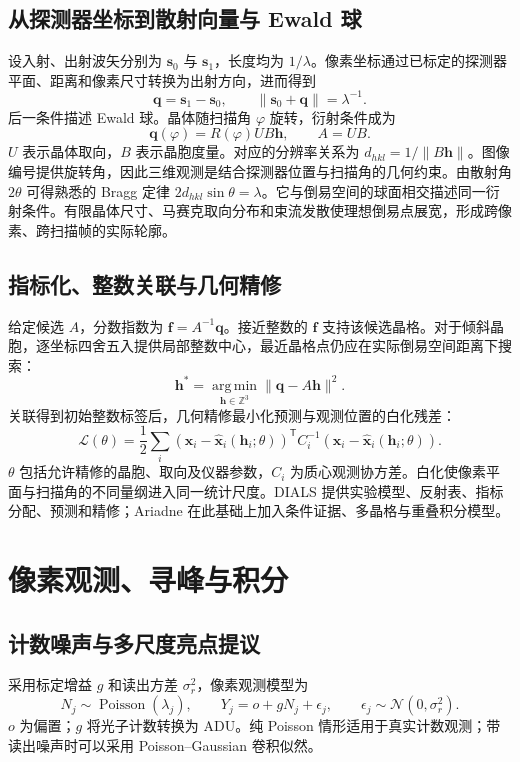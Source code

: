 \documentclass[UTF8,11pt,a4paper,fontset=fandol]{ctexart}
\newcommand{\N}{\mathcal{N}}
\newcommand{\T}{\mathsf{T}}
\newcommand{\argmin}{\operatorname*{arg\,min}}
\begin{document}
\subsection{从探测器坐标到散射向量与 Ewald 球}
设入射、出射波矢分别为 $\bm s_0$ 与 $\bm s_1$，长度均为 $1/\lambda$。像素坐标通过已标定的探测器平面、距离和像素尺寸转换为出射方向，进而得到
\begin{equation}
\bm q=\bm s_1-\bm s_0,\qquad
\|\bm s_0+\bm q\|=\lambda^{-1}.
\end{equation}
后一条件描述 Ewald 球。晶体随扫描角 $\varphi$ 旋转，衍射条件成为
\begin{equation}
\bm q(\varphi)=R(\varphi)UB\bm h,
\qquad A=UB.
\end{equation}
$U$ 表示晶体取向，$B$ 表示晶胞度量。对应的分辨率关系为 $d_{hkl}=1/\|B\bm h\|$。图像编号提供旋转角，因此三维观测是结合探测器位置与扫描角的几何约束。由散射角 $2\theta$ 可得熟悉的 Bragg 定律 $2d_{hkl}\sin\theta=\lambda$。它与倒易空间的球面相交描述同一衍射条件。有限晶体尺寸、马赛克取向分布和束流发散使理想倒易点展宽，形成跨像素、跨扫描帧的实际轮廓。

\subsection{指标化、整数关联与几何精修}
给定候选 $A$，分数指数为 $\bm f=A^{-1}\bm q$。接近整数的 $\bm f$ 支持该候选晶格。对于倾斜晶胞，逐坐标四舍五入提供局部整数中心，最近晶格点仍应在实际倒易空间距离下搜索：
\begin{equation}
\bm h^*=\argmin_{\bm h\in\mathbb Z^3}\|\bm q-A\bm h\|^2.
\end{equation}
关联得到初始整数标签后，几何精修最小化预测与观测位置的白化残差：
\begin{equation}
\mathcal L(\theta)=\frac12\sum_i
\left(\bm x_i-\widehat{\bm x}_i(\bm h_i;\theta)\right)^\T
C_i^{-1}
\left(\bm x_i-\widehat{\bm x}_i(\bm h_i;\theta)\right).
\end{equation}
$\theta$ 包括允许精修的晶胞、取向及仪器参数，$C_i$ 为质心观测协方差。白化使像素平面与扫描角的不同量纲进入同一统计尺度。DIALS 提供实验模型、反射表、指标分配、预测和精修；Ariadne 在此基础上加入条件证据、多晶格与重叠积分模型。

\section{像素观测、寻峰与积分}
\subsection{计数噪声与多尺度亮点提议}
采用标定增益 $g$ 和读出方差 $\sigma_r^2$，像素观测模型为
\begin{equation}
N_j\sim\operatorname{Poisson}(\lambda_j),\qquad
Y_j=o+gN_j+\epsilon_j,\qquad
\epsilon_j\sim\N(0,\sigma_r^2).
\end{equation}
$o$ 为偏置；$g$ 将光子计数转换为 ADU。纯 Poisson 情形适用于真实计数观测；带读出噪声时可以采用 Poisson--Gaussian 卷积似然。
\end{document}
